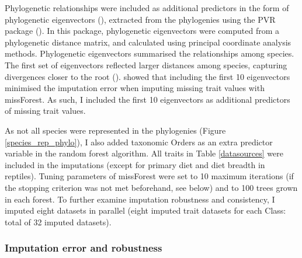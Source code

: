 Phylogenetic relationships were included as additional predictors in the form of phylogenetic eigenvectors (\cite{Diniz-Filho2012}), extracted from the phylogenies using the PVR package (\cite{Santos2018}). In this package, phylogenetic eigenvectors were computed from a phylogenetic distance matrix, and calculated using principal coordinate analysis methods. Phylogenetic eigenvectors summarised the relationships among species. The first set of eigenvectors reflected larger distances among species, capturing divergences closer to the root (\cite{Diniz-Filho2012}). \cite{Penone2014} showed that including the first 10 eigenvectors minimised the imputation error when imputing missing trait values with missForest. As such, I included the first 10 eigenvectors as additional predictors of missing trait values.   

As not all species were represented in the phylogenies (Figure \ref{species_rep_phylo}), I also added taxonomic Orders as an extra predictor variable in the random forest algorithm. All traits in Table \ref{datasources} were included in the imputations (except for primary diet and diet breadth in reptiles). Tuning parameters of missForest were set to 10 maximum iterations (if the stopping criterion was not met beforehand, see below) and to 100 trees grown in each forest. To further examine imputation robustness and consistency, I imputed eight datasets in parallel (eight imputed trait datasets for each Class: total of 32 imputed datasets).

\subsubsection{Imputation error and robustness}

